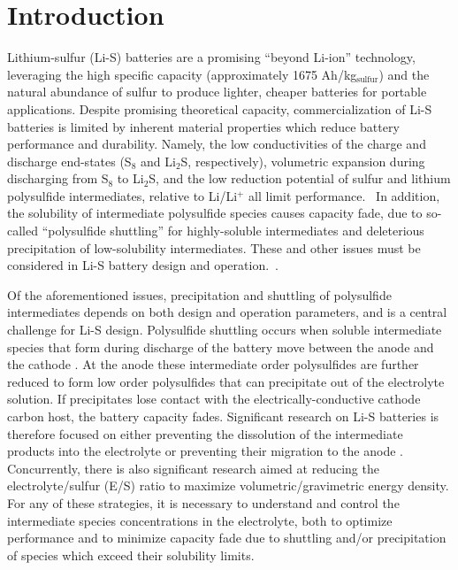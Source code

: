\documentclass{elsarticle}
\begin{document}
\section{Introduction}
Lithium-sulfur (Li-S) batteries are a promising “beyond Li-ion”  technology, leveraging the high specific capacity (approximately 1675 Ah/kg$_\mathrm{sulfur}$) and the natural abundance of sulfur to produce lighter, cheaper batteries for portable applications. Despite promising theoretical capacity, commercialization of Li-S batteries is limited by inherent material properties which reduce battery performance and durability. Namely, the low conductivities of the charge and discharge end-states (S$_8$ and Li$_2$S, respectively), volumetric expansion during discharging from S$_8$ to Li$_2$S, and the low reduction potential of sulfur and lithium polysulfide intermediates, relative to Li/Li$^+$ all limit performance.~\cite{ZHANG2018831, FRONCZEK2013183, C5EE01388G} In addition, the solubility of intermediate polysulfide species causes capacity fade, due to so-called ``polysulfide shuttling'' for highly-soluble intermediates and deleterious precipitation of low-solubility intermediates.  These and other issues must be considered in Li-S battery design and operation.~\cite{BRUCKNER201482, akridge2004}.

Of the aforementioned issues, precipitation and shuttling of polysulfide intermediates depends on both design and operation parameters, and is a central challenge for Li-S design. Polysulfide shuttling occurs when soluble intermediate species that form during discharge of the battery move between the anode and the cathode \cite{C5EE01388G}. At the anode these intermediate order polysulfides are further reduced to form low order polysulfides that can precipitate out of the electrolyte solution. If precipitates lose contact with the electrically-conductive cathode carbon host, the battery capacity fades.  Significant research on Li-S batteries is therefore focused on either preventing the dissolution of the intermediate products into the electrolyte or preventing their migration to the anode \cite{CHEN20201605, liu2016, cheng2019, pang2015}. Concurrently, there is also significant research aimed at reducing the electrolyte/sulfur (E/S) ratio to maximize volumetric/gravimetric energy density. For any of these strategies, it is necessary to understand and control the intermediate species concentrations in the electrolyte, both to optimize performance and to minimize capacity fade due to shuttling and/or precipitation of species which exceed their solubility limits. %
\end{document}
